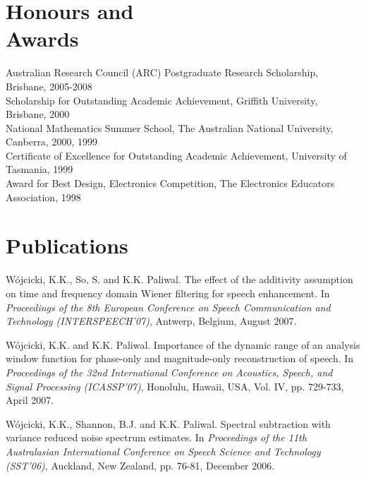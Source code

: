 \documentclass[margin,line]{resume}
\begin{document}
\begin{resume}
    \section{\mysidestyle Honours and\\Awards} 

    Australian Research Council (ARC) Postgraduate Research Scholarship, Brisbane, 2005-2008 \\
    Scholarship for Outstanding Academic Achievement, Griffith University, Brisbane, 2000 \\
    National Mathematics Summer School, The Australian National University, Canberra, 2000, 1999 \\
    Certificate of Excellence for Outstanding Academic Achievement, University of Tasmania, 1999 \\
    Award for Best Design, Electronics Competition, The Electronics Educators Association, 1998 


    \section{\mysidestyle Publications}

    W\'ojcicki, K.K., So, S. and K.K. Paliwal. 
    The effect of the additivity assumption on time and frequency domain {Wiener} filtering for speech enhancement.
    In {\sl Proceedings of the 8th European Conference on Speech Communication and Technology (INTERSPEECH'07)}, 
    Antwerp, Belgium, August 2007. %

    W\'ojcicki, K.K. and K.K. Paliwal. 
    Importance of the dynamic range of an analysis window function for phase-only and magnitude-only reconstruction of speech.
    In {\sl Proceedings of the 32nd International Conference on Acoustics, Speech, and Signal Processing (ICASSP'07)},
    Honolulu, Hawaii, USA, Vol. IV, pp. 729-733, April 2007. 

    W\'ojcicki, K.K., Shannon, B.J. and K.K. Paliwal.
    Spectral subtraction with variance reduced noise spectrum estimates.
    In {\sl Proceedings of the 11th Australasian International Conference on Speech Science and Technology (SST'06)},
    Auckland, New Zealand, pp. 76-81, December 2006. 



\end{resume}
\end{document}
